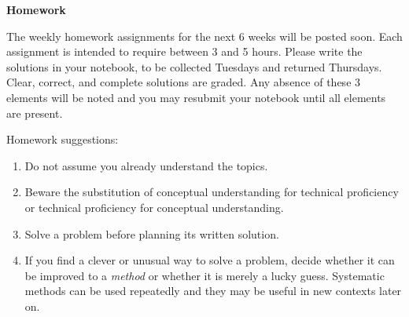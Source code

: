 \documentclass[12pt]{article}
\begin{document}
\begin{center}\textbf{Homework}\end{center}

The weekly homework assignments for the next 6 weeks will be posted soon.  Each assignment is intended to require between 3 and 5 hours.  Please write the solutions in your notebook, to be collected Tuesdays and returned Thursdays.  Clear, correct, and complete solutions are graded.  Any absence of these 3 elements will be noted and you may resubmit your notebook until all elements are present.

\vspace{1pc}

Homework suggestions:
\begin{enumerate}
\item{Do not assume you already understand the topics.}
\item{Beware the substitution of conceptual understanding for technical proficiency or technical proficiency for conceptual understanding.}
\item{Solve a problem before planning its written solution.}
\item{If you find a clever or unusual way to solve a problem, decide whether it can be improved to a \emph{method} or whether it is merely a lucky guess.  Systematic methods can be used repeatedly and they may be useful in new contexts later on.}
\end{enumerate}
\end{document}
